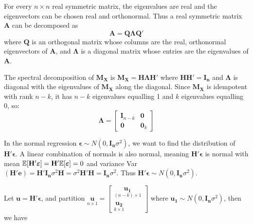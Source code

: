 \documentclass[DIV=14,titlepage=false]{scrreprt}
\begin{document}
\begin{theorem}
    For every $n \times n$ real symmetric matrix, the eigenvalues are real and the eigenvectors can be chosen real and orthonormal. Thus a real symmetric matrix $\mathbf {A}$ can be decomposed as
    \[ \mathbf {A} =\mathbf {Q} \mathbf {\Lambda } \mathbf {Q'}\]
    where $\mathbf {Q}$ is an orthogonal matrix whose columns are the real, orthonormal eigenvectors of $\mathbf {A}$, and $\mathbf {\Lambda}$ is a diagonal matrix whose entries are the eigenvalues of $\mathbf {A}$. 
\end{theorem}

The spectral decomposition of $\mathbf{M_X}$ is $\mathbf{M_X}=\mathbf{H}\mathbf{\Lambda}\mathbf{H'}$ where $\mathbf{HH'}=\mathbf{I_n}$ and $\mathbf{\Lambda}$ is diagonal with the eigenvalues of $\mathbf{M_X}$ along the diagonal. Since $\mathbf {M_X}$ is idempotent with rank $n-k$, it has $n-k$ eigenvalues equalling 1 and $k$ eigenvalues equalling 0, so: 
\[\mathbf{\Lambda} = \begin{bmatrix}
    \mathbf{I}_{n-k} & \mathbf{0} \\
    \mathbf{0} & \mathbf{0}_k
    \end{bmatrix} \]
    
In the normal regression $\boldsymbol{\epsilon} \sim N(0,\mathbf{I_n} \sigma^2)$, we want to find the distribution of $\mathbf{H'}\boldsymbol{\epsilon}$. A linear combination of normals is also normal, meaning $\mathbf{H'}\boldsymbol{\epsilon}$ is normal with mean $\mathbb{E}[\mathbf{H'}\boldsymbol{\varepsilon}]=\mathbf{H'}\mathbb{E}[\boldsymbol{\varepsilon}]=0$ and variance Var$(\mathbf{H'}\boldsymbol{e})=\mathbf{H'}\mathbf{I_n} \sigma^2 \mathbf{H} = \sigma^2 \mathbf{H'}\mathbf{H} = \mathbf{I_n} \sigma^2$. Thus $\mathbf{H'}\boldsymbol{\epsilon} \sim N(0,\mathbf{I_n} \sigma^2)$.

Let $\mathbf{u}=\mathbf{H'}\boldsymbol{\epsilon}$, and partition $\underset{n \times 1}{\mathbf{u}}=\begin{bmatrix}
    \underset{(n-k) \times 1}{\mathbf{u_1}}\\
    \underset{k \times 1}{\mathbf{u_2}}
\end{bmatrix}$ where $\mathbf{u_1} \sim N(0,\mathbf{I_n} \sigma^2)$, then we have
\end{document}
